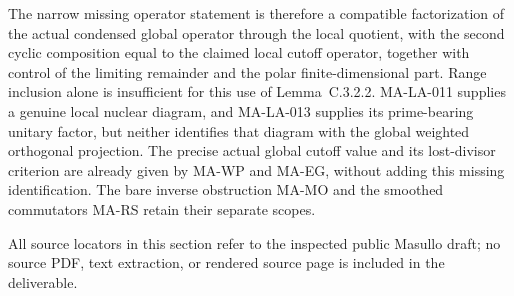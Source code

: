 The narrow missing operator statement is therefore a compatible
factorization of the actual condensed global operator through
the local quotient, with the second cyclic composition equal
to the claimed local cutoff operator, together with control
of the limiting remainder and the polar finite-dimensional
part.  Range inclusion alone is insufficient for this use of
Lemma~C.3.2.2.  MA-LA-011 supplies a genuine local nuclear
diagram, and MA-LA-013 supplies its prime-bearing unitary
factor, but neither identifies that diagram with the global
weighted orthogonal projection.  The precise actual global
cutoff value and its lost-divisor criterion are already given
by MA-WP and MA-EG, without adding this missing identification.
The bare inverse obstruction MA-MO and the smoothed
commutators MA-RS retain their separate scopes.

All source locators in this section refer to the inspected
public Masullo draft; no source PDF, text extraction, or
rendered source page is included in the deliverable.
